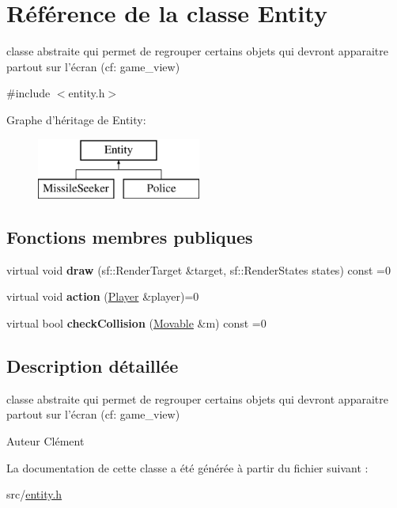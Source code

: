 \hypertarget{class_entity}{\section{Référence de la classe Entity}
\label{class_entity}
}


classe abstraite qui permet de regrouper certains objets qui devront apparaitre partout sur l'écran (cf\+: game\+\_\+view)  




{\ttfamily \#include $<$entity.\+h$>$}

Graphe d'héritage de Entity\+:\begin{figure}[H]
\begin{center}
\leavevmode
\includegraphics[height=2.000000cm]{class_entity}
\end{center}
\end{figure}
\subsection*{Fonctions membres publiques}
\begin{DoxyCompactItemize}
\item 
\hypertarget{class_entity_a0a633036824859a3b60c853f83afe723}{virtual void {\bfseries draw} (sf\+::\+Render\+Target \&target, sf\+::\+Render\+States states) const =0}\label{class_entity_a0a633036824859a3b60c853f83afe723}

\item 
\hypertarget{class_entity_a0bc71020ccfbb3872e56440b8e0454eb}{virtual void {\bfseries action} (\hyperlink{class_player}{Player} \&player)=0}\label{class_entity_a0bc71020ccfbb3872e56440b8e0454eb}

\item 
\hypertarget{class_entity_a21a2409eeb8af85fdabc145a4f464799}{virtual bool {\bfseries check\+Collision} (\hyperlink{class_movable}{Movable} \&m) const =0}\label{class_entity_a21a2409eeb8af85fdabc145a4f464799}

\end{DoxyCompactItemize}


\subsection{Description détaillée}
classe abstraite qui permet de regrouper certains objets qui devront apparaitre partout sur l'écran (cf\+: game\+\_\+view) 

\begin{DoxyAuthor}{Auteur}
Clément 
\end{DoxyAuthor}


La documentation de cette classe a été générée à partir du fichier suivant \+:\begin{DoxyCompactItemize}
\item 
src/\hyperlink{entity_8h}{entity.\+h}\end{DoxyCompactItemize}
